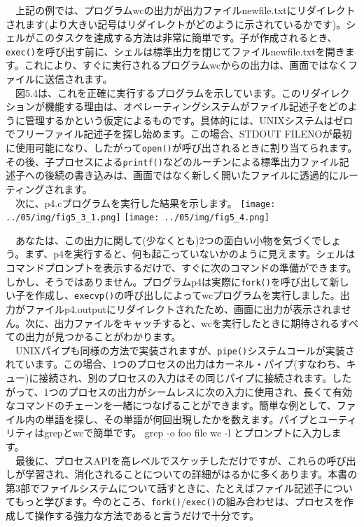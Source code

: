 　上記の例では、プログラムwcの出力が出力ファイルnewfile.txtにリダイレクトされます(より大きい記号はリダイレクトがどのように示されているかです)。シェルがこのタスクを達成する方法は非常に簡単です。子が作成されるとき、\texttt{exec()}を呼び出す前に、シェルは標準出力を閉じてファイルnewfile.txtを開きます。これにより、すぐに実行されるプログラムwcからの出力は、画面ではなくファイルに送信されます。\\
　図5.4は、これを正確に実行するプログラムを示しています。このリダイレクションが機能する理由は、オペレーティングシステムがファイル記述子をどのように管理するかという仮定によるものです。具体的には、UNIXシステムはゼロでフリーファイル記述子を探し始めます。この場合、STDOUT
FILENOが最初に使用可能になり、したがって\texttt{open()}が呼び出されるときに割り当てられます。その後、子プロセスによる\texttt{printf()}などのルーチンによる標準出力ファイル記述子への後続の書き込みは、画面ではなく新しく開いたファイルに透過的にルーティングされます。\\
　次に、p4.cプログラムを実行した結果を示します。
\texttt{[image: ../05/img/fig5\_3\_1.png]}
\texttt{[image: ../05/img/fig5\_4.png]}

　あなたは、この出力に関して(少なくとも)2つの面白い小物を気づくでしょう。まず、p4を実行すると、何も起こっていないかのように見えます。シェルはコマンドプロンプトを表示するだけで、すぐに次のコマンドの準備ができます。しかし、そうではありません。プログラムp4は実際に\texttt{fork()}を呼び出して新しい子を作成し、\texttt{execvp()}の呼び出しによってwcプログラムを実行しました。出力がファイルp4.outputにリダイレクトされたため、画面に出力が表示されません。次に、出力ファイルをキャッチすると、wcを実行したときに期待されるすべての出力が見つかることがわかります。\\
　UNIXパイプも同様の方法で実装されますが、\texttt{pipe()}システムコールが実装されています。この場合、1つのプロセスの出力はカーネル・パイプ(すなわち、キュー)に接続され、別のプロセスの入力はその同じパイプに接続されます。したがって、1つのプロセスの出力がシームレスに次の入力に使用され、長くて有効なコマンドのチェーンを一緒につなげることができます。簡単な例として、ファイル内の単語を探し、その単語が何回出現したかを数えます。パイプとユーティリティはgrepとwcで簡単です。
grep -o foo file \textbar{} wc -l とプロンプトに入力します。\\
　最後に、プロセスAPIを高レベルでスケッチしただけですが、これらの呼び出しが学習され、消化されることについての詳細がはるかに多くあります。本書の第3部でファイルシステムについて話すときに、たとえばファイル記述子についてもっと学びます。今のところ、\texttt{fork()}/\texttt{exec()}の組み合わせは、プロセスを作成して操作する強力な方法であると言うだけで十分です。

